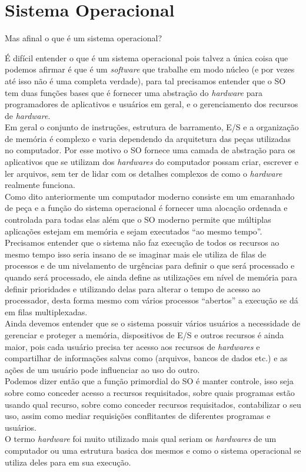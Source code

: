 \chapter[Sistema Operaciona]{Sistema Operacional}

Mas afinal o que é um sistema operacional?

É difícil entender o que é um sistema operacional pois talvez a única coisa que podemos afirmar é que é um \emph{software} que trabalhe em modo núcleo (e por vezes até isso não é uma completa verdade), para tal precisamos entender que o SO tem duas funções bases que é fornecer uma abstração do \emph{hardware} para programadores de aplicativos e usuários em geral, e o gerenciamento dos recursos de \emph{hardware}.\\
 Em geral o conjunto de instruções, estrutura de barramento, E/S e a organização de memória é complexo e varia dependendo da arquitetura das peças utilizadas no computador. Por esse motivo o SO fornece uma camada de abstração para os aplicativos que se utilizam dos \emph{hardwares} do computador possam criar, escrever e ler arquivos, sem ter de lidar com os detalhes complexos de como o \emph{hardware} realmente funciona.\\
Como dito anteriormente um computador moderno consiste em um emaranhado de peça e a função do sistema operacional é fornecer uma alocação ordenada e controlada para todas elas além que o SO moderno permite que múltiplas aplicações estejam em memória e sejam executados “ao mesmo tempo”. \\
Precisamos entender que o sistema não faz  execução de todos os recursos ao mesmo tempo isso seria insano de se imaginar mais ele utiliza de filas de processos e de um nivelamento de urgências para definir o que será processado e quando será processado, ele ainda define as utilizações em nível de memória para definir prioridades e utilizando delas para alterar o tempo  de acesso ao processador, desta forma mesmo com vários processos “abertos” a execução se dá em filas multiplexadas.\\
Ainda devemos entender que se o sistema possuir vários usuários a necessidade de gerenciar e proteger a memória, dispositivos de E/S e outros recursos é ainda maior, pois cada usuário precisa ter acesso aos recursos de \emph{hardwares} e compartilhar de informações salvas como (arquivos, bancos de dados etc.) e as ações de um usuário pode influenciar ao uso do outro. \\
Podemos dizer então que a função primordial do SO é manter controle, isso seja sobre como conceder acesso a recursos requisitados, sobre quais programas estão usando qual recurso, sobre como conceder recursos requisitados, contabilizar o seu uso, assim como mediar requisições conflitantes de diferentes programas e usuários.\\
O termo \emph{hardware} foi muito utilizado mais qual seriam os \emph{hardwares} de um computador ou uma estrutura basica dos mesmos e como o sistema operacional se utiliza deles para em sua execução. 


